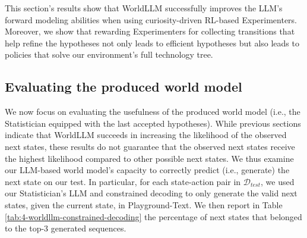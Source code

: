 \documentclass{article}
\begin{document}
This section's results show that WorldLLM successfully improves the LLM's forward modeling abilities when using curiosity-driven RL-based Experimenters. Moreover, we show that rewarding Experimenters for collecting transitions that help refine the hypotheses not only leads to efficient hypotheses but also leads to policies that solve our environment's full technology tree. 

\subsection{Evaluating the produced world model} \label{sec:worldllm-eval_world_model}
We now focus on evaluating the usefulness of the produced world model (i.e., the Statistician equipped with the last accepted hypotheses). While previous sections indicate that WorldLLM succeeds in increasing the likelihood of the observed next states, these results do not guarantee that the observed next states receive the highest likelihood compared to other possible next states. We thus examine our LLM-based world model's capacity to correctly predict (i.e., generate) the next state on our test. In particular, for each state-action pair in $\mathcal{D}_{test}$, we used our Statistician's LLM and constrained decoding to only generate the valid next states, given the current state, in Playground-Text. 
We then report in Table~ \ref{tab:4-worldllm-constrained-decoding} the percentage of next states that belonged to the top-3 generated sequences.
\end{document}
